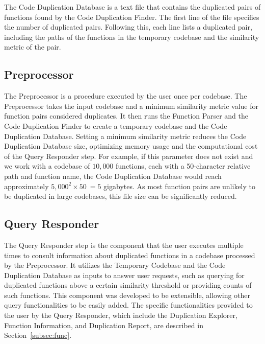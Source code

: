 The Code Duplication Database is a text file that contains the duplicated pairs of functions found by the Code Duplication Finder. The first line of the file specifies the number of duplicated pairs. Following this, each line lists a duplicated pair, including the paths of the functions in the temporary codebase and the similarity metric of the pair.

\subsection{Preprocessor}
\label{subsec:setup}

The Preprocessor is a procedure executed by the user once per codebase. 
The Preprocessor takes the input codebase and a minimum similarity metric value for function pairs considered duplicates. 
It then runs the Function Parser and the Code Duplication Finder to create a temporary codebase and the Code Duplication Database. 
Setting a minimum similarity metric reduces the Code Duplication Database size, optimizing memory usage and the computational 
cost of the Query Responder step. For example, if this parameter does not exist and we work with a codebase of $10,000$ functions, 
each with a 50-character relative path and function name, the Code Duplication Database would reach approximately $5,000^2 \times 50 ~= 5$ gigabytes. 
As most function pairs are unlikely to be duplicated in large codebases, this file size can be significantly reduced.

\subsection{Query Responder}

The Query Responder step is the component that the user executes multiple times to consult information 
about duplicated functions in a codebase processed by the Preprocessor. 
It utilizes the Temporary Codebase and the Code Duplication Database as inputs to answer user requests, 
such as querying for duplicated functions above a certain similarity threshold or providing counts of such functions.
This component was developed to be extensible, allowing other query functionalities to be easily added. 
The specific functionalities provided to the user by the Query Responder, which include the 
Duplication Explorer, Function Information, and Duplication Report, are described in Section~\ref{subsec:func}.

